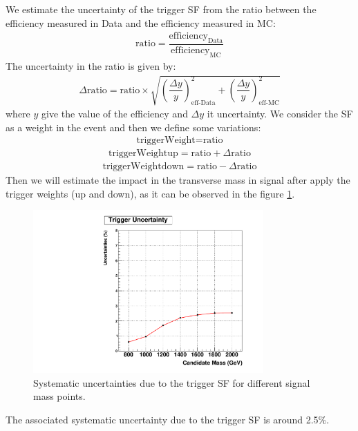 We estimate the uncertainty of the trigger SF from the ratio between the efficiency measured in Data and the efficiency measured in MC:
\begin{eqnarray}
\text{ratio} = \dfrac{\text{efficiency}_{\text{Data}}}{\text{efficiency}_{\text{MC}}} 
\end{eqnarray}
The uncertainty in the ratio is given by:
\begin{eqnarray}
 \Delta \text{ratio} = \text{ratio} \times \sqrt{  \left(\dfrac{ \Delta y }{y} \right)^{2}_{\text{eff-Data}} + \left(\dfrac{ \Delta y }{y} \right)^{2}_{\text{eff-MC}} } 
\end{eqnarray}
where $y$ give the value of the efficiency and $\Delta y$ it uncertainty. We consider the SF as a weight in the event and then we define some variations:
\begin{eqnarray}
 \text{triggerWeight} = \text{ratio}
\end{eqnarray}
\begin{eqnarray}
 \text{triggerWeightup} = \text{ratio} +  \Delta \text{ratio}
\end{eqnarray}
\begin{eqnarray}
 \text{triggerWeightdown} = \text{ratio} -  \Delta \text{ratio}
\end{eqnarray}
Then we will estimate the impact in the transverse mass in signal after apply the trigger weights (up and down), as it can be observed in the figure \ref{fig:Trigguncert}.
\begin{figure}[!ht]
\caption{Systematic uncertainties due to the trigger SF for different signal mass points. }
\begin{center}
\includegraphics[width=250pt]{figuresARC/triggerWeight/TriggerUncert.pdf}
\end{center}
\label{fig:Trigguncert}
\end{figure}
The associated systematic uncertainty due to the trigger SF is around 2.5$\%$.

